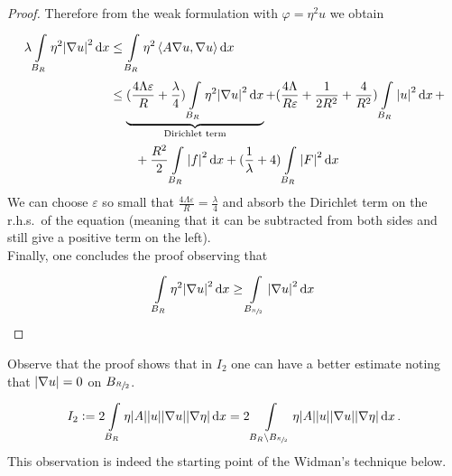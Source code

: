\begin{proof}
	Therefore from the weak formulation with \( \varphi = \eta^{2} u\) we obtain
	\begin{align}
		\lambda \int\limits_{B_{R}}^{} \eta^{2}\abs{\nabla u}^{2} \dd{x}
		 & \leq \int\limits_{B_{R}}^{} \eta^{2} \left\langle A \nabla u, \nabla u \right\rangle \dd{x}  \\
		 & \leq  \underbrace{(\frac{4 \Lambda \varepsilon}{R}+ \frac{\lambda}{4}) \int\limits_{B_{R}}^{} \eta^{2}\abs{\nabla u}^{2} \dd{x}}_{\text{Dirichlet term}} + (\frac{4 \Lambda}{R \varepsilon}+\frac{1}{2 R^{2}}+\frac{4}{R^{2}}) \int\limits_{B_{R}}^{} \abs{u}^{2} \dd{x} +  \\
		 & \qquad + \frac{R^{2}}{2} \int\limits_{B_{R}}^{} \abs{f}^{2} \dd{x} + (\frac{1}{\lambda}+4) \int\limits_{B_{R}}^{} \abs{F}^{2} \dd{x}
	\end{align}
	We can choose \(\varepsilon \) so small that \(\frac{4 \Lambda \varepsilon}{R} = \frac{\lambda}{4}\) and absorb the Dirichlet term on the r.h.s.\ of the equation (meaning that it can be subtracted from both sides and still give a positive term on the left).\\
	Finally, one concludes the proof observing that
	\begin{gather}
		\int\limits_{B_{R}}^{} \eta^{2}\abs{\nabla u}^{2} \dd{x} \geq \int\limits_{B_{\sfrac{R}{2}}}^{} \abs{\nabla u}^{2} \dd{x}
	\end{gather}
\end{proof}
Observe that the proof shows that in \(I_{2}\) one can have a better estimate noting that \(\abs{\nabla u}=0\) on \(B_{\sfrac{R}{2}}\).
\begin{gather}
	I_{2}:= 2 \int\limits_{B_{R}}^{} \eta \abs{A} \abs{u}\abs{\nabla u}\abs{\nabla \eta} \dd{x} = 2 \int\limits_{B_{R}\setminus B_{\sfrac{R}{2}}}^{} \eta \abs{A}\abs{u}\abs{\nabla u}\abs{\nabla \eta} \dd{x}.
\end{gather}
This observation is indeed the starting point of the Widman's technique below.


